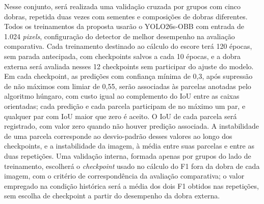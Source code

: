 Nesse conjunto, ser\'a realizada uma valida\c{c}\~ao cruzada por grupos com cinco dobras, repetida duas vezes com sementes e composi\c{c}\~oes de dobras diferentes. Todos os treinamentos da proposta usar\~ao o YOLO26s-OBB com entrada de 1.024 \textit{pixels}, configura\c{c}\~ao do detector de melhor desempenho na avalia\c{c}\~ao comparativa. Cada treinamento destinado ao c\'alculo do escore ter\'a 120 \'epocas, sem parada antecipada, com checkpoints salvos a cada 10 \'epocas, e a dobra externa ser\'a avaliada nesses 12 checkpoints sem participar do ajuste do modelo. Em cada checkpoint, as predi\c{c}\~oes com confian\c{c}a m\'inima de 0,3, ap\'os supress\~ao de n\~ao m\'aximos com limiar de 0,55, ser\~ao associadas \`as parcelas anotadas pelo algoritmo h\'ungaro, com custo igual ao complemento do IoU entre as caixas orientadas; cada predi\c{c}\~ao e cada parcela participam de no m\'aximo um par, e qualquer par com IoU maior que zero \'e aceito. O IoU de cada parcela ser\'a registrado, com valor zero quando n\~ao houver predi\c{c}\~ao associada. A instabilidade de uma parcela corresponde ao desvio-padr\~ao desses valores ao longo dos checkpoints, e a instabilidade da imagem, \`a m\'edia entre suas parcelas e entre as duas repeti\c{c}\~oes. Uma valida\c{c}\~ao interna, formada apenas por grupos do lado de treinamento, escolher\'a o \textit{checkpoint} usado no c\'alculo do F1 fora da dobra de cada imagem, com o crit\'erio de correspond\^encia da avalia\c{c}\~ao comparativa; o valor empregado na condi\c{c}\~ao hist\'orica ser\'a a m\'edia dos dois F1 obtidos nas repeti\c{c}\~oes, sem escolha de checkpoint a partir do desempenho da dobra externa.


